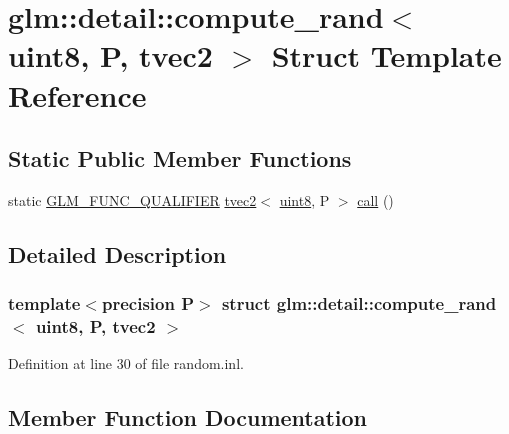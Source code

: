 \hypertarget{structglm_1_1detail_1_1compute__rand_3_01uint8_00_01_p_00_01tvec2_01_4}{}\section{glm\+::detail\+::compute\+\_\+rand$<$ uint8, P, tvec2 $>$ Struct Template Reference}
\label{structglm_1_1detail_1_1compute__rand_3_01uint8_00_01_p_00_01tvec2_01_4}
\subsection*{Static Public Member Functions}
\begin{DoxyCompactItemize}
\item 
static \mbox{\hyperlink{setup_8hpp_a33fdea6f91c5f834105f7415e2a64407}{G\+L\+M\+\_\+\+F\+U\+N\+C\+\_\+\+Q\+U\+A\+L\+I\+F\+I\+ER}} \mbox{\hyperlink{structglm_1_1tvec2}{tvec2}}$<$ \mbox{\hyperlink{namespaceglm_1_1detail_aef2588f97d090cc19fbbe0c74fe17c8f}{uint8}}, P $>$ \mbox{\hyperlink{structglm_1_1detail_1_1compute__rand_3_01uint8_00_01_p_00_01tvec2_01_4_aa2d8c5aa8c17ad7e38dfbf9460bde2f5}{call}} ()
\end{DoxyCompactItemize}


\subsection{Detailed Description}
\subsubsection*{template$<$precision P$>$\newline
struct glm\+::detail\+::compute\+\_\+rand$<$ uint8, P, tvec2 $>$}



Definition at line 30 of file random.\+inl.



\subsection{Member Function Documentation}
\mbox{\label{structglm_1_1detail_1_1compute__rand_3_01uint8_00_01_p_00_01tvec2_01_4_aa2d8c5aa8c17ad7e38dfbf9460bde2f5}} 
